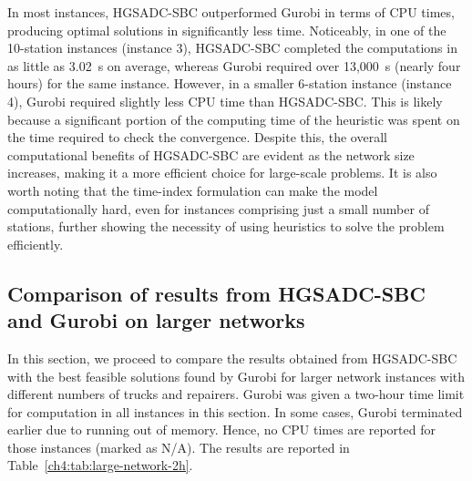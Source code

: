 In most instances, HGSADC-SBC outperformed Gurobi in terms of CPU times, producing optimal solutions
in significantly less time. Noticeably, in one of the 10-station instances (instance 3), HGSADC-SBC
completed the computations in as little as 3.02~s on average, whereas Gurobi required over 13,000~s
(nearly four hours) for the same instance. However, in a smaller 6-station instance (instance 4),
Gurobi required slightly less CPU time than HGSADC-SBC. This is likely because a significant portion
of the computing time of the heuristic was spent on the time required to check the convergence.
Despite this, the overall computational benefits of HGSADC-SBC are evident as the network size
increases, making it a more efficient choice for large-scale problems. It is also worth noting that
the time-index formulation can make the model computationally hard, even for instances comprising
just a small number of stations, further showing the necessity of using heuristics to solve the
problem efficiently.

\subsection{Comparison of results from HGSADC-SBC and Gurobi on larger networks}\label{ch4:subsec:large-network-comparison}

In this section, we proceed to compare the results obtained from HGSADC-SBC with the best feasible
solutions found by Gurobi for larger network instances with different numbers of trucks and
repairers. Gurobi was given a two-hour time limit for computation in all instances in this section.
In some cases, Gurobi terminated earlier due to running out of memory. Hence, no CPU times are
reported for those instances (marked as N/A). The results are reported in Table~\ref{ch4:tab:large-network-2h}.

